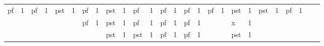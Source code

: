 \begin{table}[H]
\begin{center}
\begin{tabular}{llllllllllllllllllllllllll}
\cellcolor[HTML]{9AFF99}pf  & \cellcolor[HTML]{9AFF99}1 & \cellcolor[HTML]{9AFF99}pf  & \cellcolor[HTML]{9AFF99}1 & \cellcolor[HTML]{FFCCC9}pst & \cellcolor[HTML]{9AFF99}1 & \cellcolor[HTML]{9AFF99}pf  & \cellcolor[HTML]{9AFF99}1 & \cellcolor[HTML]{FFCCC9}pst & \cellcolor[HTML]{9AFF99}1 & \cellcolor[HTML]{9AFF99}pf  & \cellcolor[HTML]{9AFF99}1 & \cellcolor[HTML]{9AFF99}pf  & \cellcolor[HTML]{9AFF99}1 & \cellcolor[HTML]{9AFF99}pf & \cellcolor[HTML]{9AFF99}1 & \cellcolor[HTML]{9AFF99}pf  & \cellcolor[HTML]{9AFF99}1 & \cellcolor[HTML]{FFCCC9}pst & \cellcolor[HTML]{9AFF99}1 & \cellcolor[HTML]{FFCCC9}pst & \cellcolor[HTML]{9AFF99}1 & \cellcolor[HTML]{9AFF99}pf  & \cellcolor[HTML]{9AFF99}1 &                             &                           \\
                            &                           &                             &                           &                             &                           & \cellcolor[HTML]{9AFF99}pf  & \cellcolor[HTML]{9AFF99}1 & \cellcolor[HTML]{FFCCC9}pst & \cellcolor[HTML]{9AFF99}1 & \cellcolor[HTML]{9AFF99}pf  & \cellcolor[HTML]{9AFF99}1 & \cellcolor[HTML]{9AFF99}pf  & \cellcolor[HTML]{9AFF99}1 & \cellcolor[HTML]{9AFF99}pf & \cellcolor[HTML]{9AFF99}1 &                             &                           & \cellcolor[HTML]{C0C0C0}x   & \cellcolor[HTML]{9AFF99}1 &                             &                           &                             &                           &                             &                           \\
                            &                           &                             &                           &                             &                           &                             &                           & \cellcolor[HTML]{FFCCC9}pst & \cellcolor[HTML]{9AFF99}1 & \cellcolor[HTML]{FFCCC9}pst & \cellcolor[HTML]{9AFF99}1 & \cellcolor[HTML]{9AFF99}pf  & \cellcolor[HTML]{9AFF99}1 & \cellcolor[HTML]{9AFF99}pf & \cellcolor[HTML]{9AFF99}1 &                             &                           & \cellcolor[HTML]{FFCCC9}pst & \cellcolor[HTML]{9AFF99}1 &                             &                           &                             &                           &                             &                          
\end{tabular}
\end{center}
\end{table}

